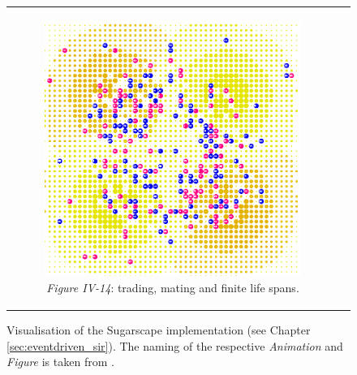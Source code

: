 \begin{figure}[H]
\begin{center}
\begin{tabular}{c c}
		\begin{subfigure}[b]{0.4\textwidth}
			\centering
			\includegraphics[width=1\textwidth, angle=0]{./fig/background/abs/sugarscape_trading_mating.png}
			\caption{\textit{Figure IV-14}: trading, mating and finite life spans.}
			\label{fig:sugarscape_visualisation_trading_mating}
		\end{subfigure}
	\end{tabular}
	
	\caption{Visualisation of the Sugarscape implementation (see Chapter \ref{sec:eventdriven_sir}). The naming of the respective \textit{Animation} and \textit{Figure} is taken from \cite{epstein_growing_1996}.} 
	\label{fig:sugarscape_visualisation}
\end{center}
\end{figure}